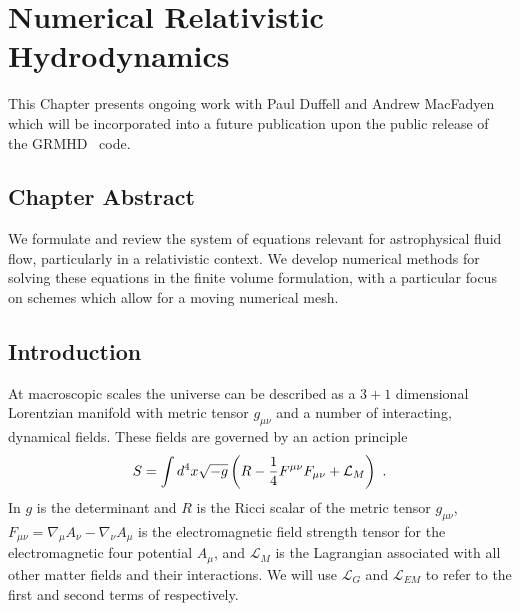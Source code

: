 \renewcommand{\chapid}{numerics}


\newcommand{\LL}{\mathcal{L}}


\chapter{Numerical Relativistic Hydrodynamics}

This Chapter presents ongoing work with Paul Duffell and Andrew MacFadyen which will be incorporated into a future publication upon the public release of the GRMHD \Disco\ code.


\section{Chapter Abstract}

We formulate and review the system of equations relevant for astrophysical fluid flow, particularly in a relativistic context.  We develop numerical methods for solving these equations in the finite volume formulation, with a particular focus on schemes which allow for a moving numerical mesh.  


\section{Introduction} 

At macroscopic scales the universe can be described as a $3+1$ dimensional Lorentzian manifold with metric tensor $g_{\mu\nu}$ and a number of interacting, dynamical fields.  These fields are governed by an action principle
\begin{equation}
	S = \int d^4x \sqrt{-g} \left( R - \frac{1}{4}F^{\mu\nu}F_{\mu\nu}  + \LL_M\right)\ . \eqlabel{action}
\end{equation}
In  $g$ is the determinant and $R$ is the Ricci scalar of the metric tensor $g_{\mu\nu}$, $F_{\mu\nu} = \nabla_\mu A_\nu - \nabla_\nu A_\mu$ is the electromagnetic field strength tensor for the electromagnetic four potential $A_\mu$, and $\LL_M$ is the Lagrangian associated with all other matter fields and their interactions.  We will use $\LL_G$ and $\LL_{EM}$ to refer to the first and second terms of  respectively.

